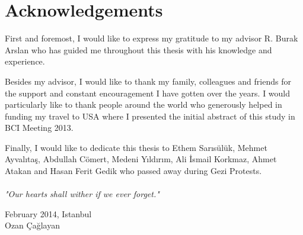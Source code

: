 \documentclass[12pt]{article}
\title{}
\renewcommand{\headrulewidth}{0pt}
\numberwithin{equation}{section}
\numberwithin{figure}{section}
\numberwithin{table}{section}
\begin{document}

%
%

\clearpage
\vspace*{-0.35cm}
\section*{Acknowledgements}
\vspace*{6pt}
\par{
    First and foremost, I would like to express my gratitude to my advisor
    R. Burak Arslan who has guided me throughout this thesis with
    his knowledge and experience.
}
\par{
    Besides my advisor, I would like to thank my family, colleagues and friends
    for the support and constant encouragement I have gotten over the years.
    I would particularly like to thank people around the world who generously helped
    in funding my travel to USA where I presented the initial abstract of this study
    in BCI Meeting 2013.
}
\par{
    Finally, I would like to dedicate this thesis to Ethem Sarısülük,
    Mehmet Ayvalıtaş, Abdullah Cömert, Medeni Yıldırım, Ali İsmail Korkmaz,
    Ahmet Atakan and Hasan Ferit Gedik who passed away during Gezi Protests.\\\\
    \emph{"Our hearts shall wither if we ever forget."}
}

\vspace*{2cm}
\begin{flushright}
February 2014, Istanbul \\
Ozan Çağlayan
\end{flushright}
\clearpage

\fancypagestyle{plain}{\fancyhf{}
  \renewcommand{\headrulewidth}{0pt}}
\setcounter{tocdepth}{5}
\renewcommand\contentsname{\normalsize\bfseries Table of Contents}
\thispagestyle{empty}
\vspace*{0.15cm}
\tableofcontents
\clearpage

\renewcommand\nomname{\normalsize\bfseries List of Abbreviations}
\thispagestyle{empty}
\vspace*{0.15cm}
\printnomenclature
\clearpage
\end{document}
